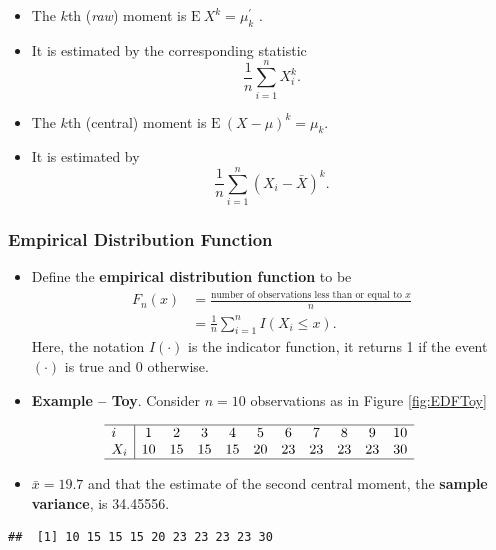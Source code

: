 \documentclass[]{book}
\providecommand{\tightlist}{%
  \setlength{\itemsep}{0pt}\setlength{\parskip}{0pt}}
\begin{document}
\begin{itemize}
\item
  The \(k\)th (\emph{raw}) moment is
  \(\mathrm{E~} X^k = \mu^{\prime}_k\) .
\item
  It is estimated by the corresponding statistic
  \[\frac{1}{n} \sum_{i=1}^n X_i^k .\]
\item
  The \(k\)th (central) moment is \(\mathrm{E~} (X-\mu)^k = \mu_k\).
\item
  It is estimated by
  \[\frac{1}{n} \sum_{i=1}^n \left(X_i-\bar{X}\right)^k .\]
\end{itemize}

\subsubsection{Empirical Distribution
Function}\label{empirical-distribution-function}

\begin{itemize}
\item
  Define the \textbf{empirical distribution function} to be
  \[\begin{aligned}
  F_n(x) &= \frac{\text{number of observations less than or equal to }x}{n} \\
  &= \frac{1}{n} \sum_{i=1}^n I\left(X_i \le x\right).\end{aligned}\]
  Here, the notation \(I(\cdot)\) is the indicator function, it returns
  1 if the event \((\cdot)\) is true and 0 otherwise.
\item
  \textbf{Example -- Toy}. Consider \(n=10\) observations as in Figure
  \ref{fig:EDFToy}
\end{itemize}

\begin{equation*}
\begin{array}{l|cccccccccc}
    \hline
i   &1&2&3&4&5&6&7&8&9&10 \\
X_i & 10 &15 &15 &15 &20 &23 &23 &23 &23 &30\\
    \hline
    \end{array}\end{equation*}

\begin{itemize}
\tightlist
\item
  \(\bar{x} = 19.7\) and that the estimate of the second central moment,
  the \textbf{sample variance}, is 34.45556.
\end{itemize}

\begin{verbatim}
##  [1] 10 15 15 15 20 23 23 23 23 30
\end{verbatim}
\end{document}
